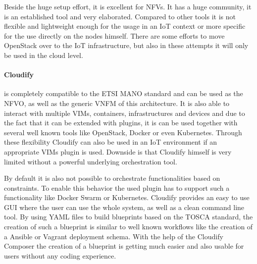 Beside the huge setup effort, it is excellent for \acp{NFV}.
It has a huge community, it is an established tool and very elaborated.
Compared to other tools it is not flexible and lightweight enough for the usage in an \ac{IoT} context or more specific for the use directly on the nodes himself.
There are some efforts to move OpenStack over to the \ac{IoT} infrastructure\autocite{OpenStack:IoT}\autocite{OpenStack:Kubernetes:IoT}, but also in these attempts it will only be used in the cloud level.

\paragraph{Cloudify} is completely compatible to the \ac{ETSI} \ac{MANO} standard and can be used as the \ac{NFVO}, as well as the generic \ac{VNFM} of this architecture.\autocite[cf.]{Cloudify:MANO}
It is also able to interact with multiple \acp{VIM}, containers, infrastructures and devices and due to the fact that it can be extended with plugins, it is can be used together with several well known tools like OpenStack, Docker or even Kubernetes.\autocite[cf.]{Cloudify:MANO}
Through these flexibility Cloudify can also be used in an \ac{IoT} environment if an appropriate \acp{VIM} plugin is used.
Downside is that Cloudify himself is very limited without a powerful underlying orchestration tool.

By default it is also not possible to orchestrate functionalities based on constraints.
To enable this behavior the used plugin has to support such a functionality like Docker Swarm or Kubernetes.
Cloudify provides an easy to use \ac{GUI} where the user can use the whole system, as well as a clean command line tool.
By using \ac{YAML} files to build blueprints based on the \ac{TOSCA} standard, the creation of such a blueprint is similar to well known workflows like the creation of a Ansible or Vagrant deployment schema.
With the help of the Cloudify Composer the creation of a blueprint is getting much easier and also usable for users without any coding experience.

